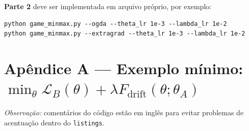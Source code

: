 \documentclass[9pt,a4paper]{extarticle}
\begin{document}
\textbf{Parte 2} deve ser implementada em arquivo próprio, por exemplo:
\begin{verbatim}
python game_minmax.py --ogda --theta_lr 1e-3 --lambda_lr 1e-2
python game_minmax.py --extragrad --theta_lr 1e-3 --lambda_lr 1e-2
\end{verbatim}

\clearpage
\appendix
\section*{Apêndice A — Exemplo mínimo: $\min_\theta \mathcal{L}_B(\theta)+\lambda F_{\text{drift}}(\theta;\theta_A)$}
\noindent
\textit{Observação:} comentários do código estão em inglês para evitar problemas de acentuação dentro do \texttt{listings}.
\end{document}

